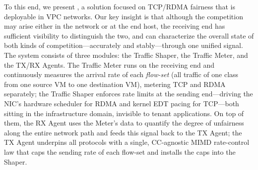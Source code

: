 To this end, we present \sys, a solution focused on TCP/RDMA fairness
that is deployable in VPC networks. Our key insight is that although the
competition may arise either in the network or at the end host, the
receiving end has sufficient visibility to distinguish the two, and can
characterize the overall state of both kinds of competition---accurately
and stably---through one unified signal. The system consists of three
modules: the Traffic Shaper, the Traffic Meter, and the TX/RX Agents.
The Traffic Meter runs on the receiving end and continuously measures
the arrival rate of each \emph{flow-set} (all traffic of one class from
one source VM to one destination VM), metering TCP and RDMA separately;
the Traffic Shaper enforces rate limits at the sending end---driving the
NIC's hardware scheduler for RDMA and kernel EDT pacing for TCP---both
sitting in the infrastructure domain, invisible to tenant applications.
On top of them, the RX Agent uses the Meter's data to quantify the
degree of unfairness along the entire network path and feeds this signal
back to the TX Agent; the TX Agent underpins all protocols with a
single, CC-agnostic MIMD rate-control law that caps the sending rate of
each flow-set and installs the caps into the Shaper.

